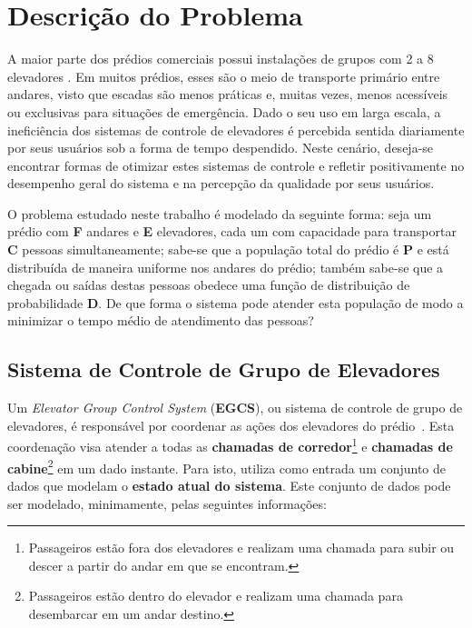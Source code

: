 \chapter{\label{chap:problem}Descrição do Problema}

A maior parte dos prédios comerciais possui instalações de grupos com 2 a 8
elevadores \cite{KOEHLEROTTIGER02}. Em muitos prédios, esses são o meio de
transporte primário entre andares, visto que escadas são menos práticas e,
muitas vezes, menos acessíveis ou exclusivas para situações de emergência. Dado
o seu uso em larga escala, a ineficiência dos sistemas de controle de elevadores
é percebida sentida diariamente por seus usuários sob a forma de tempo
despendido. Neste cenário, deseja-se encontrar formas de otimizar estes sistemas
de controle e refletir positivamente no desempenho geral do sistema e na
percepção da qualidade por seus usuários.

O problema estudado neste trabalho é modelado da seguinte forma: seja um prédio
com \textbf{F} andares e \textbf{E} elevadores, cada um com capacidade para
transportar \textbf{C} pessoas simultaneamente; sabe-se que a população total do
prédio é \textbf{P} e está distribuída de maneira uniforme nos andares do
prédio; também sabe-se que a chegada ou saídas destas pessoas obedece uma função
de distribuição de probabilidade \textbf{D}. De que forma o sistema pode atender
esta população de modo a minimizar o tempo médio de atendimento das pessoas?

\section{\label{section:egcs}Sistema de Controle de Grupo de Elevadores}

Um \textit{Elevator Group Control System} (\textbf{EGCS}), ou sistema de
controle de grupo de elevadores, é responsável por coordenar as ações dos
elevadores do prédio~\cite{kuzunuki1984elevator}. Esta coordenação visa atender
a todas as \textbf{chamadas de corredor}\footnote{Passageiros estão fora dos
elevadores e realizam uma chamada para subir ou descer a partir do andar em que
se encontram.} e \textbf{chamadas de cabine}\footnote{Passageiros estão dentro
do elevador e realizam uma chamada para desembarcar em um andar destino.} em um
dado instante. Para isto, utiliza como entrada um conjunto de dados que modelam
o \textbf{estado atual do sistema}. Este conjunto de dados pode ser modelado,
minimamente, pelas seguintes informações:

